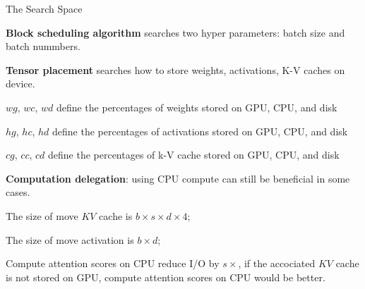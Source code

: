\begin{frame}{The Search Space}
    \begin{enumerate}
        \footnotesize{
        \item \textbf{Block scheduling algorithm} searches two hyper parameters: batch size and batch nummbers.
        \item \textbf{Tensor placement} searches how to store weights, activations, K-V caches on device.
        \begin{itemize}
            \scriptsize{
            \item $wg$, $wc$, $wd$ define the percentages of weights stored on GPU, CPU, and disk
            \item  $hg$, $hc$, $hd$ define the percentages of activations stored on GPU, CPU, and disk
            \item $cg$, $cc$, $cd$ define the percentages of k-V cache stored on GPU, CPU, and disk
            }
        \end{itemize}
        }
        \item \textbf{Computation delegation}: using CPU compute can still be beneficial in some cases.
        \begin{itemize}
            \scriptsize{
            \item The size of move $KV$ cache is $b \times s \times d \times 4$;
            \item The size of move activation is $b \times d$;
            \item Compute attention scores on CPU reduce I/O by $s\times$, if the accociated $KV$ cache is not stored on GPU, compute attention scores on CPU would be better.
            }
        \end{itemize}
    \end{enumerate}
\end{frame}

